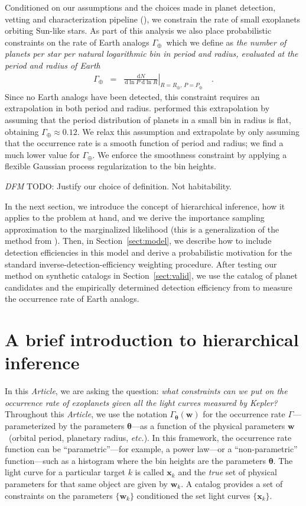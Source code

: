 \documentclass[12pt,preprint]{aastex}
\newcommand{\project}[1]{{\sffamily #1}}
\newcommand{\kepler}{\project{Kepler}}
\newcommand{\paper}{\textsl{Article}}
\newcommand{\foreign}[1]{\emph{#1}}
\newcommand{\etc}{\foreign{etc.}}
\newcommand{\Sect}[1]{Section~\ref{sect:#1}}
\newcommand{\sect}[1]{\Sect{#1}}
\newcommand{\dd}{\ensuremath{\,\mathrm{d}}}
\newcommand{\bvec}[1]{\ensuremath{\boldsymbol{#1}}}
\newcommand{\todo}[3]{{\color{#2} \emph{#1} TODO: #3}}
\newcommand{\dfmtodo}[1]{\todo{DFM}{red}{#1}}
\newcommand{\rate}{\ensuremath{\Gamma}}
\newcommand{\ratepar}{{\ensuremath{\theta}}}
\newcommand{\ratepars}{{\ensuremath{\bvec{\ratepar}}}}
\newcommand{\radius}{\ensuremath{R}}
\newcommand{\period}{\ensuremath{P}}
\newcommand{\data}{{\ensuremath{\bvec{x}}}}
\newcommand{\entry}{{\ensuremath{\bvec{w}}}}
\newcommand{\gammaearth}{{\ensuremath{\rate_\oplus}}}
\begin{document}
Conditioned on our assumptions and the choices made in planet detection,
vetting and characterization pipeline (\citealt{petigura-a, petigura}), we
constrain the rate of small exoplanets orbiting Sun-like stars.
As part of this analysis we also place probabilistic constraints on the rate
of Earth analogs \gammaearth\ which we define as \emph{the number of planets
per star per natural logarithmic bin in period and radius, evaluated at the
period and radius of Earth}
\begin{eqnarray}
\gammaearth &=&
\left.\frac{\dd N}{\dd\ln\period\,\dd\ln\radius}\right|
_{\radius=\radius_\oplus,\,\period=\period_\oplus}\quad.
\end{eqnarray}
Since no Earth analogs have been detected, this constraint requires an
extrapolation in both period and radius.
\citet{petigura} performed this extrapolation by assuming that the period
distribution of planets in a small bin in radius is flat, obtaining
$\gammaearth \approx 0.12$.
We relax this assumption and extrapolate by only assuming that the occurrence
rate is a smooth function of period and radius; we find a much lower value for
\gammaearth.
We enforce the smoothness constraint by applying a flexible Gaussian process
regularization to the bin heights.

\dfmtodo{Justify our choice of definition. Not habitability.}

In the next section, we introduce the concept of hierarchical inference, how
it applies to the problem at hand, and we derive the importance sampling
approximation to the marginalized likelihood (this is a generalization of the
method from \citealt{hogge}).
Then, in \sect{model}, we describe how to include detection efficiencies in
this model and derive a probabilistic motivation for the standard
inverse-detection-efficiency weighting procedure.
After testing our method on synthetic catalogs in \sect{valid}, we use the
catalog of planet candidates and the empirically determined detection
efficiency from \citet{petigura} to measure the occurrence rate of Earth
analogs.

\section{A brief introduction to hierarchical inference}

In this \paper, we are asking the question: \emph{what constraints can we put
on the occurrence rate of exoplanets given all the light curves measured by
\kepler?}
Throughout this \paper, we use the notation $\rate_\ratepars(\entry)$ for the
occurrence rate \rate---parameterized by the parameters \ratepars---as a
function of the physical parameters \entry\ (orbital period, planetary radius,
\etc).
In this framework, the occurrence rate function can be ``parametric''---for
example, a power law---or a ``non-parametric'' function---such as a histogram
where the bin heights are the parameters \ratepars.
The light curve for a particular target $k$ is called $\data_k$ and the
\emph{true} set of physical parameters for that same object are given by
$\entry_k$.
A catalog provides a set of constraints on the parameters $\{\entry_k\}$
conditioned the set light curves $\{\data_k\}$.
\end{document}
